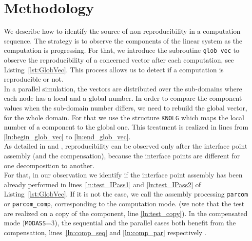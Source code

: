 \section{Methodology}
\label{sec:methodology}
%
We describe how to identify the source of 
non-reproducibility in a computation sequence. 
The strategy is to observe the components
of the linear system as the computation is progressing.
For that, we introduce the subroutine \texttt{glob\_vec} 
to observe the reproducibility of a concerned vector after each computation, 
see Listing~\ref{lst:GlobVec}. 
This process allows us to detect if a computation is reproducible or not.\\
%
In a parallel simulation, the vectors are distributed over the sub-domains where each 
node has a local and a global number. 
In order to compare the component values when the sub-domain number differs, 
we need to rebuild the global vector, \ie for the whole domain. 
For that we use the structure \texttt{KNOLG} which maps the local number of a component
to the global one.
This treatment is realized in
lines from \ref{ln:begin_glob_vec} to \ref{ln:end_glob_vec}.\\
%
As detailed in \cite{LaND15} and \cite{LaND16}, reproducibility can be observed 
only after the interface point assembly (and the compensation), because
the interface points are different for one 
decomposition to another.\\
For that, in our observation we identify if the interface point assembly
has been already performed in lines \ref{ln:test_IPass1} and \ref{ln:test_IPass2}
of Listing~\ref{lst:GlobVec}. If it is not the case, we call the assembly processing \texttt{parcom}
or \texttt{parcom\_comp}, corresponding to the computation mode.
(we note that the test are realized on a copy of the component, line \ref{ln:test_copy}).
In the compensated mode (\texttt{MODASS}=3), the sequential and 
the parallel cases both benefit from the compensation, lines~\ref{ln:comp_seq} and \ref{ln:comp_par} respectively .

